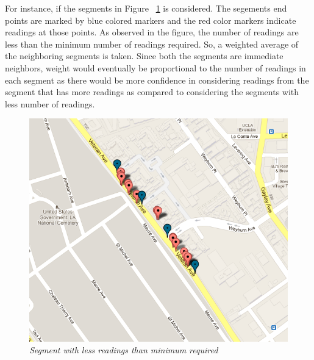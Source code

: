 \documentclass[12pt,fullpage,doublespace]{article}
\begin{document}
For instance, if the segments in Figure ~\ref{fig:lessReadings} is considered. The segements end points are marked by blue colored markers and the red color markers indicate readings at those points. As observed in the figure, the number of readings are less than the minimum number of readings required. So, a weighted average of the neighboring segments is taken. Since both the segments are immediate neighbors, weight would eventually be proportional to the number of readings in each segment as there would be more confidence in considering readings from the segment that has more readings as compared to considering the segments with less number of readings. 
\begin{figure}
\begin{center}
\includegraphics[scale=0.35]{lessReadings.png}
\caption{\small \sl Segment with less readings than minimum required}
\label{fig:lessReadings}
\end{center}
\end{figure}


\newpage
\end{document}
